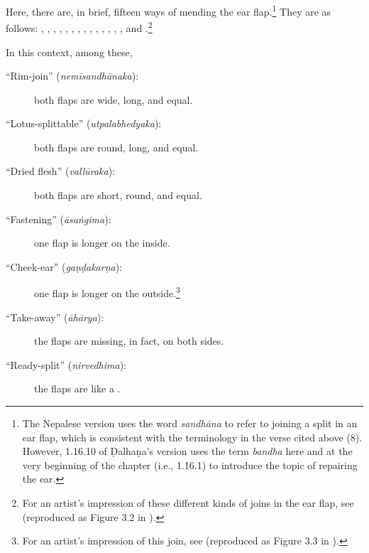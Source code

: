 \begin{translation}
Here, there are, in brief, fifteen ways of mending the ear flap.\footnote{The Nepalese version uses the word \emph{sandhāna} to refer to joining a split in an ear flap, which is consistent with the terminology in the verse cited above (8). However, 1.16.10 of Ḍalhaṇa's version \citep[77]{vulgate} uses the term \emph{bandha} here and at the very beginning of the chapter (i.e., 1.16.1) to introduce the topic of repairing the ear.}  They are as follows:
    , , , , , , , , , , 
    , ,
    , , and .\footnote{For an artist's impression of these different kinds of joins in the ear flap, see \cite[290]{majn-1975} (reproduced as Figure 3.2 in \cite[154]{wuja-2003}).}
    
    In this context, among these, 

    \begin{description}
        
\item[\mdseries``Rim-join'' (\emph{nemīsandhānaka}):]
        both flaps are wide, long, and equal.
        
\item[\mdseries``Lotus-splittable'' (\emph{utpalabhedyaka}):]
        both flaps are round, long, and equal.
        
\item[\mdseries``Dried flesh'' (\emph{vallūraka}):]
        both flaps are short, round, and equal.
        
\item[\mdseries``Fastening'' (\emph{āsaṅgima}):]
        one flap is longer on the inside.
        
\item[\mdseries``Cheek-ear'' (\emph{gaṇḍakarṇa}):]
        one flap is longer on the outside.\footnote{For an artist's impression of this join, see \cite[291]{majn-1975} (reproduced as Figure 3.3 in \cites[155]{wuja-2003}).}
        
\item[\mdseries``Take-away'' (\emph{āhārya}):]
        the flaps are missing, in fact, on both sides.
        
\item[\mdseries``Ready-split'' (\emph{nirvedhima}):]
        the flaps are like a .
        

\end{description}
\end{translation}
